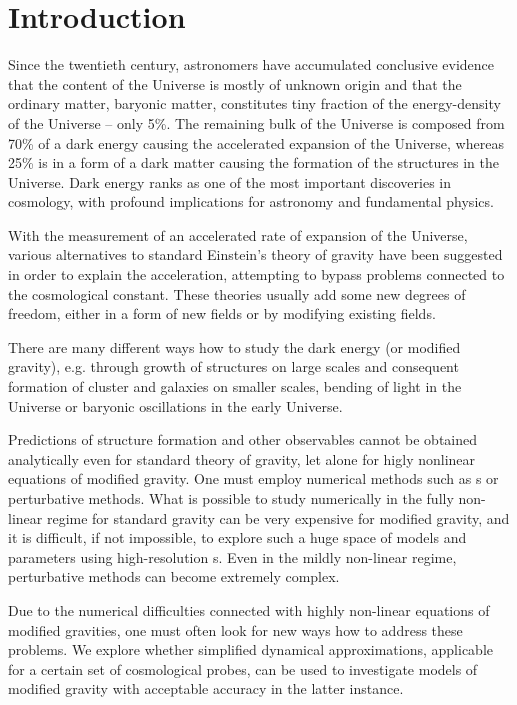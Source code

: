 \chapter*{Introduction}


Since the twentieth century, astronomers have accumulated conclusive evidence that the content of the Universe is mostly of unknown origin and that the ordinary matter, baryonic matter, constitutes tiny fraction of the energy-density of the Universe -- only 5\%. The remaining bulk of the Universe is composed from 70\% of a dark energy causing the accelerated expansion of the Universe, whereas 25\% is in a form of a dark matter causing the formation of the structures in the Universe. Dark energy ranks as one of the most important discoveries in cosmology, with profound implications for astronomy and fundamental physics.

With the measurement of an accelerated rate of expansion of the Universe, various alternatives to standard Einstein's theory of gravity have been suggested in order to explain the acceleration, attempting to bypass problems connected to the cosmological constant. These theories usually add some new degrees of freedom, either in a form of new fields or by modifying existing fields.

There are many different ways how to study the dark energy (or modified gravity), e.g. through growth of structures on large scales and consequent formation of cluster and galaxies on smaller scales, bending of light in the Universe or baryonic oscillations in the early Universe.

Predictions of structure formation and other observables cannot be obtained analytically even for standard theory of gravity, let alone for higly nonlinear equations of modified gravity. One must employ numerical methods such as \nbodysim s or perturbative methods. What is possible to study numerically in the fully non-linear regime for standard gravity can be very expensive for modified gravity, and it is difficult, if not impossible, to explore such a huge space of models and parameters using high-resolution \nbodysim s. Even in the mildly non-linear regime, perturbative methods can become extremely complex.

Due to the numerical difficulties connected with highly non-linear equations of modified gravities, one must often look for new ways how to address these problems. We explore whether simplified dynamical approximations, applicable for a certain set of cosmological probes, can be used to investigate models of modified gravity with acceptable accuracy in the latter instance.

